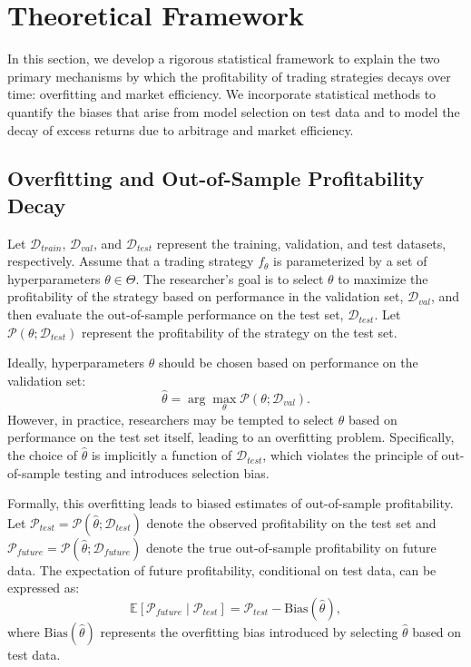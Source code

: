\section{Theoretical Framework}

In this section, we develop a rigorous statistical framework to explain the two primary mechanisms by which the profitability of trading strategies decays over time: overfitting and market efficiency. We incorporate statistical methods to quantify the biases that arise from model selection on test data and to model the decay of excess returns due to arbitrage and market efficiency.

\subsection{Overfitting and Out-of-Sample Profitability Decay}

Let $\mathcal{D}_{train}$, $\mathcal{D}_{val}$, and $\mathcal{D}_{test}$ represent the training, validation, and test datasets, respectively. Assume that a trading strategy $f_{\theta}$ is parameterized by a set of hyperparameters $\theta \in \Theta$. The researcher's goal is to select $\theta$ to maximize the profitability of the strategy based on performance in the validation set, $\mathcal{D}_{val}$, and then evaluate the out-of-sample performance on the test set, $\mathcal{D}_{test}$. Let $\mathcal{P}(\theta; \mathcal{D}_{test})$ represent the profitability of the strategy on the test set.

Ideally, hyperparameters $\theta$ should be chosen based on performance on the validation set:
\[
\hat{\theta} = \arg \max_{\theta} \mathcal{P}(\theta; \mathcal{D}_{val}).
\]
However, in practice, researchers may be tempted to select $\theta$ based on performance on the test set itself, leading to an overfitting problem. Specifically, the choice of $\hat{\theta}$ is implicitly a function of $\mathcal{D}_{test}$, which violates the principle of out-of-sample testing and introduces selection bias.

Formally, this overfitting leads to biased estimates of out-of-sample profitability. Let $\mathcal{P}_{test} = \mathcal{P}(\hat{\theta}; \mathcal{D}_{test})$ denote the observed profitability on the test set and $\mathcal{P}_{future} = \mathcal{P}(\hat{\theta}; \mathcal{D}_{future})$ denote the true out-of-sample profitability on future data. The expectation of future profitability, conditional on test data, can be expressed as:
\[
\mathbb{E}[\mathcal{P}_{future} \mid \mathcal{P}_{test}] = \mathcal{P}_{test} - \text{Bias}(\hat{\theta}),
\]
where $\text{Bias}(\hat{\theta})$ represents the overfitting bias introduced by selecting $\hat{\theta}$ based on test data.

